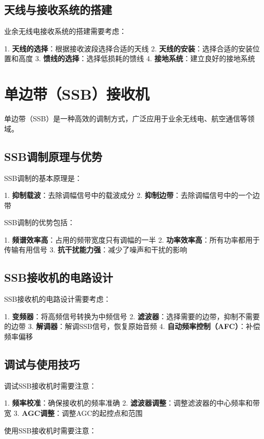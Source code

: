 \documentclass[12pt,UTF8]{ctexbook}
\begin{document}
\section{天线与接收系统的搭建}

业余无线电接收系统的搭建需要考虑：

1. \textbf{天线的选择}：根据接收波段选择合适的天线
2. \textbf{天线的安装}：选择合适的安装位置和高度
3. \textbf{馈线的选择}：选择低损耗的馈线
4. \textbf{接地系统}：建立良好的接地系统

\chapter{单边带（SSB）接收机}

单边带（SSB）是一种高效的调制方式，广泛应用于业余无线电、航空通信等领域。

\section{SSB调制原理与优势}

SSB调制的基本原理是：

1. \textbf{抑制载波}：去除调幅信号中的载波成分
2. \textbf{抑制边带}：去除调幅信号中的一个边带

SSB调制的优势包括：

1. \textbf{频谱效率高}：占用的频带宽度只有调幅的一半
2. \textbf{功率效率高}：所有功率都用于传输有用信号
3. \textbf{抗干扰能力强}：减少了噪声和干扰的影响

\section{SSB接收机的电路设计}

SSB接收机的电路设计需要考虑：

1. \textbf{变频器}：将高频信号转换为中频信号
2. \textbf{滤波器}：选择需要的边带，抑制不需要的边带
3. \textbf{解调器}：解调SSB信号，恢复原始音频
4. \textbf{自动频率控制（AFC）}：补偿频率偏移

\section{调试与使用技巧}

调试SSB接收机时需要注意：

1. \textbf{频率校准}：确保接收机的频率准确
2. \textbf{滤波器调整}：调整滤波器的中心频率和带宽
3. \textbf{AGC调整}：调整AGC的起控点和范围

使用SSB接收机时需要注意：
\end{document}
